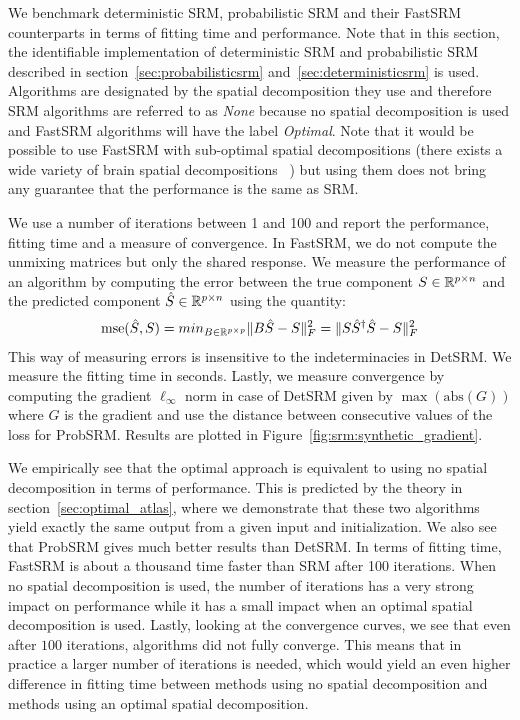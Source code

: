 \documentclass{article}
\begin{document}
We benchmark deterministic SRM, probabilistic SRM and their FastSRM counterparts in terms of fitting time and performance.
%
Note that in this section, the identifiable implementation of deterministic SRM
and probabilistic SRM described in section~\ref{sec:probabilisticsrm}
and~\ref{sec:deterministicsrm} is used. 
%
Algorithms are designated by the spatial decomposition they use and therefore SRM algorithms are referred to
as \emph{None} because no spatial decomposition is used and FastSRM algorithms will have the
label \emph{Optimal}.
%
Note that it would be possible to use FastSRM with sub-optimal
spatial decompositions (there exists a wide variety of brain spatial decompositions
~\cite{schaefer2017local, bellec2010multi, mensch2018extracting}) but
using them does not bring any guarantee that the performance is the same as SRM.
%


We use a number of iterations between 1 and 100 and report the performance,
fitting time and a measure of convergence.
%
In FastSRM, we do not compute the
unmixing matrices but only the shared response.
%
We measure the performance of an algorithm by computing the error between the true component $S \in \mathbb{R}^{p \times n}$ and
the predicted component $\hat{S} \in \mathbb{R}^{p \times n}$ using the quantity:
\begin{align}
\mathrm{mse}(\hat{S}, S) = min_{B \in \mathbb{R}^{p \times p}} \|B \hat{S} - S \|^2_F =  \|S
\hat{S}^{\dagger}\hat{S} - S \|^2_F
\end{align}
%
This way of measuring errors is
insensitive to the indeterminacies in DetSRM.
%
We measure the fitting time in seconds.
%
Lastly, we measure convergence by computing the gradient $\ell_{\infty}$ norm in
case of DetSRM given by $\max(\mathrm{abs}(G))$ where $G$ is the gradient and
use the distance between consecutive values of the loss for ProbSRM.
%
Results are plotted in Figure~\ref{fig:srm:synthetic_gradient}.
%

We empirically see that the optimal approach is equivalent to using no spatial decomposition in
terms of performance.
%
This is predicted by the theory in section~\ref{sec:optimal_atlas},
where we demonstrate that these two algorithms yield exactly the same
output from a given input and initialization.
%
%
We also see that ProbSRM gives much better results than DetSRM.
%
In terms of fitting time, FastSRM is about a thousand time faster than SRM after
100 iterations.
%
When no spatial decomposition is used, the number
of iterations has a very strong impact on performance while it has a small impact
when an optimal spatial decomposition is used.
%
Lastly, looking at the convergence curves, we see that even after $100$ iterations, algorithms did
not fully converge.
%
This means that in practice a larger number of
iterations is needed, which would yield an even higher difference in fitting time
between methods using no spatial decomposition and methods using an optimal
spatial decomposition.
%
\end{document}
